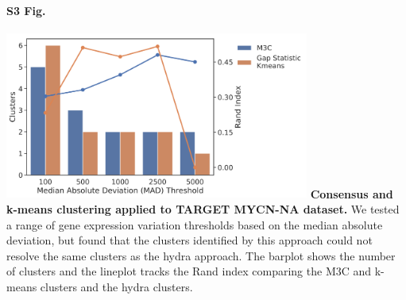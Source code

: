 \documentclass[10pt,letterpaper]{article}
\providecommand{\DIFaddbegin}{} %
\providecommand{\DIFaddend}{} %
\newcommand{\DIFaddincludegraphics}[2][]{{\color{blue}\fbox{\DIFOincludegraphics[#1]{#2}}}} %
\DeclareRobustCommand{\DIFaddbegin}{\DIFOaddbegin \let\includegraphics\DIFaddincludegraphics} %
\DeclareRobustCommand{\DIFaddend}{\DIFOaddend \let\includegraphics\DIFOincludegraphics} %
\begin{document}
\paragraph*{S3 Fig.}
\DIFaddbegin \includegraphics[width=0.75\textwidth]{img/PNG/clustering-screen}
\DIFaddend \label{S3_Fig}
{\bf{Consensus and k-means clustering applied to TARGET MYCN-NA dataset.}} We tested a range of gene expression variation thresholds based on the median absolute deviation, but found that the clusters identified by this approach could not resolve the same clusters as the hydra approach. The barplot shows the number of clusters and the lineplot tracks the Rand index comparing the M3C and k-means clusters and the hydra clusters.
\end{document}

